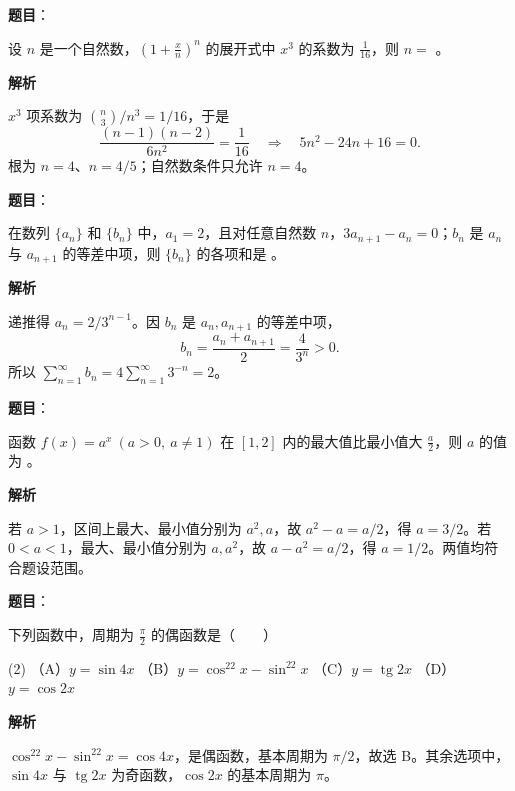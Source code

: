 \begin{answer}

\textbf{题目}：

设 $n$ 是一个自然数，$\left(1+\frac{x}{n}\right)^n$ 的展开式中 $x^3$ 的系数为 $\frac1{16}$，则 $n=$ \gkblank{}。

\textbf{解析}

$x^3$ 项系数为 $\binom n3/n^3=1/16$，于是
\nopagebreak[4]
\[
\frac{(n-1)(n-2)}{6n^2}=\frac1{16}
\quad\Longrightarrow\quad 5n^2-24n+16=0.
\]
根为 $n=4$、$n=4/5$；自然数条件只允许 $n=4$。


\end{answer}
\begin{answer}

\textbf{题目}：

在数列 $\{a_n\}$ 和 $\{b_n\}$ 中，$a_1=2$，且对任意自然数 $n$，$3a_{n+1}-a_n=0$；$b_n$ 是 $a_n$ 与 $a_{n+1}$ 的等差中项，则 $\{b_n\}$ 的各项和是 \gkblank{}。

\textbf{解析}

递推得 $a_n=2/3^{n-1}$。因 $b_n$ 是 $a_n,a_{n+1}$ 的等差中项，
\nopagebreak[4]
\[
b_n=\frac{a_n+a_{n+1}}2=\frac4{3^n}>0.
\]
所以 $\sum_{n=1}^\infty b_n=4\sum_{n=1}^\infty3^{-n}=2$。


\end{answer}
\begin{answer}

\textbf{题目}：

函数 $f(x)=a^x\ (a>0,\ a\ne1)$ 在 $[1,2]$ 内的最大值比最小值大 $\frac a2$，则 $a$ 的值为 \gkblank{}。

\textbf{解析}

若 $a>1$，区间上最大、最小值分别为 $a^2,a$，故 $a^2-a=a/2$，得 $a=3/2$。若 $0<a<1$，最大、最小值分别为 $a,a^2$，故 $a-a^2=a/2$，得 $a=1/2$。两值均符合题设范围。


\end{answer}
\begin{answer}

\textbf{题目}：

下列函数中，周期为 $\frac\pi2$ 的偶函数是\mbox{（　　）}

\begin{gkopts}(2)
\task （A）$y=\sin4x$
\task （B）$y=\cos^22x-\sin^22x$
\task （C）$y=\operatorname{tg}2x$
\task （D）$y=\cos2x$
\end{gkopts}

\textbf{解析}

$\cos^22x-\sin^22x=\cos4x$，是偶函数，基本周期为 $\pi/2$，故选 B。其余选项中，$\sin4x$ 与 $\operatorname{tg}2x$ 为奇函数，$\cos2x$ 的基本周期为 $\pi$。


\end{answer}
